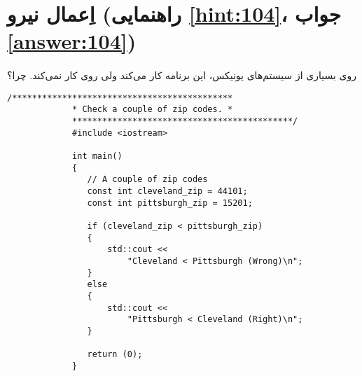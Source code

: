 \section[اِعمال نیرو]{اِعمال نیرو \protect{} (راهنمایی \ref{hint:104}، جواب \ref{answer:104})}
\paragraph{}\label{prog:102}
روی بسیاری از سیستم‌های یونیکس، این برنامه کار می‌کند ولی روی  کار نمی‌کند. چرا؟

\begin{LTR}
        \begin{lstlisting}[style=C++Style]
             /********************************************
             * Check a couple of zip codes. *
             ********************************************/
             #include <iostream>

             int main()
             {
             	// A couple of zip codes
             	const int cleveland_zip = 44101;
             	const int pittsburgh_zip = 15201;

             	if (cleveland_zip < pittsburgh_zip)
             	{
             		std::cout <<
             			"Cleveland < Pittsburgh (Wrong)\n";
             	}
             	else
             	{
             		std::cout <<
             			"Pittsburgh < Cleveland (Right)\n";
             	}

             	return (0);
             }
        \end{lstlisting}
\end{LTR}
